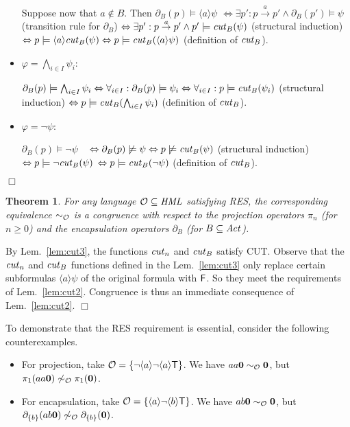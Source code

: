 \documentclass{eptcs}
\def\hmo{{\cal O}}
\def\hml{{\it HML}}
\def\hmeq{\sim_{\cal O}}
\def\enc{\partial}
\def\transa{\stackrel{a}{\rightarrow}}
\def\transa{\stackrel{a}{\rightarrow}}
\def\iff{\Leftrightarrow}
\def\true{{\sf T}}
\def\false{{\sf F}}
\newtheorem{theo}{Theorem}
\newenvironment{theorem}{\begin{theo} \rm }{\end{theo}}
\newenvironment{proof}{\begin{trivlist} \item[\hspace{\labelsep}\bf Proof:]}{\hfill $\Box$ \end{trivlist}}
\def\foralli{\forall_{i \in I}}
\newcommand{\diam}[1]{\langle#1\rangle}
\begin{document}
\begin{proof}
\begin{itemize}
Suppose now that $a \not \in B$.
Then $\enc_B(p) \models \diam{a} \psi$
$\iff \exists p': p \transa p' \wedge \enc_B(p') \models \psi$ (transition rule for $\enc_B$)
$\iff \exists p': p \transa p' \wedge p' \models {\it cut}_B(\psi)$ (structural induction)
$\iff p \models \diam{a}{\it cut}_B(\psi) \iff p \models {\it cut}_B(\diam{a}\psi)$ (definition of ${\it cut}_B$).

\item $\varphi = \bigwedge_{i \in I} \psi_i$:

$\enc_B(p) \models \bigwedge_{i \in I} \psi_i
\iff \foralli: \enc_B(p) \models \psi_i
\iff \foralli: p \models {\it cut}_B(\psi_i)$ (structural induction)
$\iff p \models {\it cut}_B(\bigwedge_{i \in I} \psi_i)$ (definition of ${\it cut}_B$).

\item $\varphi = \neg \psi$:

$\enc_B(p) \models \neg \psi$ ~
$ \iff \enc_B(p) \not \models \psi
\iff p \not \models {\it cut}_B(\psi)$ (structural induction)
$\iff p \models \neg {\it cut}_B(\psi)$ $\iff p \models {\it cut}_B(\neg \psi)$ (definition of ${\it cut}_B$).
\end{itemize}

\end{proof}
\begin{theorem}
For any language $\hmo \subseteq \hml$ satisfying RES, the corresponding equivalence $\hmeq$ is a congruence with respect to the projection operators $\pi_n$ (for $n\geq 0$) and the encapsulation operators $\enc_B$ (for $ B \subseteq {\it Act}$).
\end{theorem}

\begin{proof}
By Lem.\ \ref{lem:cut3}, the functions ${\it cut}_n$ and ${\it cut}_B$ satisfy CUT.
Observe that the ${\it cut}_n$ and ${\it cut}_B$ functions defined in the Lem.~\ref{lem:cut3} only replace certain subformulas $\diam{a} \psi$ of the original formula with $\false$. So they meet the requirements of Lem.~\ref{lem:cut2}. Congruence is thus an immediate consequence of Lem.\ \ref{lem:cut2}.
\end{proof}

To demonstrate that the RES requirement is essential, consider the following counterexamples.
\begin{itemize}
\item
For projection, take $\hmo = \{ \neg \diam{a} \neg \diam{a} \true \}$. We have $aa{\bf 0} \hmeq {\bf 0}$, but $\pi_1(aa{\bf 0}) \not\hmeq \pi_1({\bf 0})$.
\item
 For encapsulation, take $\hmo = \{ \diam{a} \neg \diam{b} \true\}$. We have $ab{\bf 0} \hmeq {\bf 0}$, but $\enc_{\{b\}}(ab{\bf 0}) \not \hmeq \enc_{\{b\}}({\bf 0})$.
\end{itemize}
\end{document}
